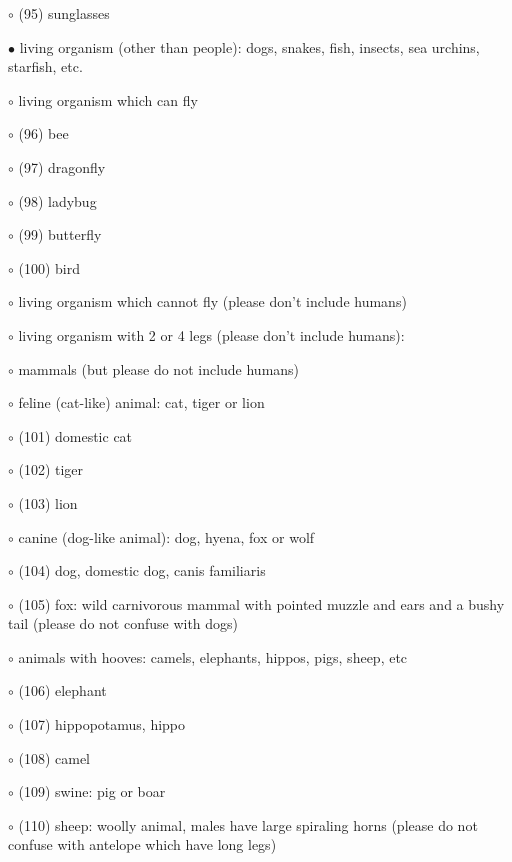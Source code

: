 \noindent \leftskip=0.25cm $\circ$ (95) sunglasses

\noindent \leftskip=0.0cm $\bullet$ living organism (other than people): dogs, snakes, fish, insects, sea urchins, starfish, etc.

\noindent \leftskip=0.25cm $\circ$ living organism which can fly

\noindent \leftskip=0.5cm $\circ$ (96) bee

\noindent \leftskip=0.5cm $\circ$ (97) dragonfly

\noindent \leftskip=0.5cm $\circ$ (98) ladybug

\noindent \leftskip=0.5cm $\circ$ (99) butterfly

\noindent \leftskip=0.5cm $\circ$ (100) bird

\noindent \leftskip=0.25cm $\circ$ living organism which cannot fly (please don't include humans)

\noindent \leftskip=0.5cm $\circ$ living organism with 2 or 4 legs (please don't include humans):

\noindent \leftskip=0.75cm $\circ$ mammals (but please do not include humans)

\noindent \leftskip=1.0cm $\circ$ feline (cat-like) animal: cat, tiger or lion

\noindent \leftskip=1.25cm $\circ$ (101) domestic cat

\noindent \leftskip=1.25cm $\circ$ (102) tiger

\noindent \leftskip=1.25cm $\circ$ (103) lion

\noindent \leftskip=1.0cm $\circ$ canine (dog-like animal): dog, hyena, fox or wolf

\noindent \leftskip=1.25cm $\circ$ (104) dog, domestic dog, canis familiaris

\noindent \leftskip=1.25cm $\circ$ (105) fox: wild carnivorous mammal with pointed muzzle and ears and a bushy tail (please do not confuse with dogs)

\noindent \leftskip=1.0cm $\circ$ animals with hooves: camels, elephants, hippos, pigs, sheep, etc

\noindent \leftskip=1.25cm $\circ$ (106) elephant

\noindent \leftskip=1.25cm $\circ$ (107) hippopotamus, hippo

\noindent \leftskip=1.25cm $\circ$ (108) camel

\noindent \leftskip=1.25cm $\circ$ (109) swine: pig or boar

\noindent \leftskip=1.25cm $\circ$ (110) sheep: woolly animal, males have large spiraling horns (please do not confuse with antelope which have long legs)

